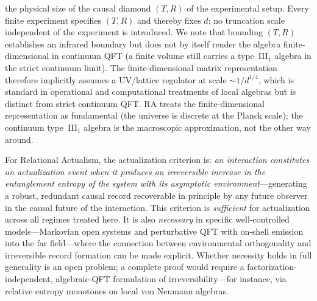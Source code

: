 \documentclass[11pt,a4paper]{article}
\theoremstyle{plain}
\theoremstyle{definition}
\theoremstyle{remark}
\begin{document}
the physical size of the causal diamond $(T, R)$ of the experimental setup.
Every finite experiment specifies $(T, R)$ and thereby fixes $d$;
no truncation scale independent of the experiment is introduced.
We note that bounding $(T, R)$ establishes an infrared boundary but does
not by itself render the algebra finite-dimensional in continuum QFT
(a finite volume still carries a type~III$_1$ algebra in the strict
continuum limit). The finite-dimensional matrix representation therefore
implicitly assumes a UV/lattice regulator at scale $\sim 1/d^{1/4}$,
which is standard in operational and computational treatments of local
algebras but is distinct from strict continuum QFT. RA treats the
finite-dimensional representation as fundamental (the universe is
discrete at the Planck scale); the continuum type~III$_1$ algebra is
the macroscopic approximation, not the other way around.

For Relational Actualism, the actualization criterion is: \emph{an interaction
constitutes an actualization event when it produces an irreversible increase in
the entanglement entropy of the system with its asymptotic environment}---generating
a robust, redundant causal record recoverable in principle by any future observer
in the causal future of the interaction. This criterion is \emph{sufficient} for
actualization across all regimes treated here. It is also \emph{necessary} in
specific well-controlled models---Markovian open systems and perturbative QFT with
on-shell emission into the far field---where the connection between environmental
orthogonality and irreversible record formation can be made explicit. Whether
necessity holds in full generality is an open problem; a complete proof would
require a factorization-independent, algebraic-QFT formulation of
irreversibility---for instance, via relative entropy monotones on local von Neumann
algebras.
\end{document}
